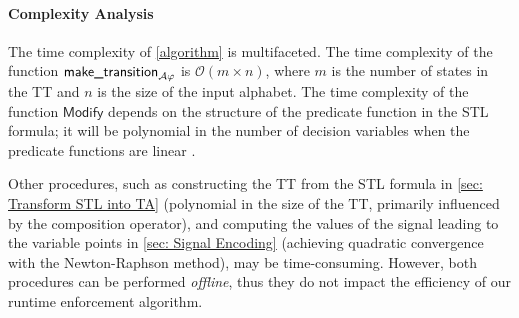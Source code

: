 
    \paragraph{Complexity Analysis} The time complexity of \cref{algorithm} is multifaceted. The time complexity of the function $\textsf{make\_transition}_{\mathcal{A}{\varphi}}$ is $\mathcal{O}(m \times n)$, where $m$ is the number of states in the TT and $n$ is the size of the input alphabet. The time complexity of the function $\textsf{Modify}$ depends on the structure of the predicate function in the STL formula; it will be polynomial in the number of decision variables when the predicate functions are linear \cite{nesterov1994interior}.

    Other procedures, such as constructing the TT from the STL formula in \cref{sec: Transform STL into TA} (polynomial in the size of the TT, primarily influenced by the composition operator), and computing the values of the signal leading to the variable points in \cref{sec: Signal Encoding} (achieving quadratic convergence with the Newton-Raphson method), may be time-consuming. However, both procedures can be performed \emph{offline}, thus they do not impact the efficiency of our runtime enforcement algorithm.
